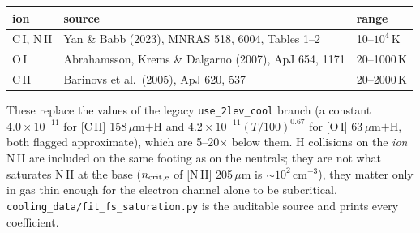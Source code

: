 \documentclass[english,a4paper]{my_memo}
\begin{document}
\begin{center}
\begin{tabular}{lll}
\hline
ion & source & range \\
\hline
C\,I, N\,II & Yan \& Babb (2023), MNRAS 518, 6004, Tables 1--2 & 10--$10^4$\,K \\
O\,I  & Abrahamsson, Krems \& Dalgarno (2007), ApJ 654, 1171 & 20--1000\,K \\
C\,II & Barinovs et al.\ (2005), ApJ 620, 537 & 20--2000\,K \\
\hline
\end{tabular}
\end{center}

\noindent
These replace the values of the legacy \texttt{use\_2lev\_cool} branch
(a constant $4.0\times10^{-11}$ for [C\,II] 158\,$\mu$m$+$H and
$4.2\times10^{-11}(T/100)^{0.67}$ for [O\,I] 63\,$\mu$m$+$H, both
flagged approximate), which are 5--20$\times$ below them.  H collisions
on the \emph{ion} N\,II are included on the same footing as on the
neutrals; they are not what saturates N\,II at the base
($n_{\rm crit,e}$ of [N\,II] 205\,$\mu$m is ${\sim}10^2\,\mathrm{cm^{-3}}$),
they matter only in gas thin enough for the electron channel alone to be
subcritical.  \texttt{cooling\_data/fit\_fs\_saturation.py} is the
auditable source and prints every coefficient.
\end{document}
